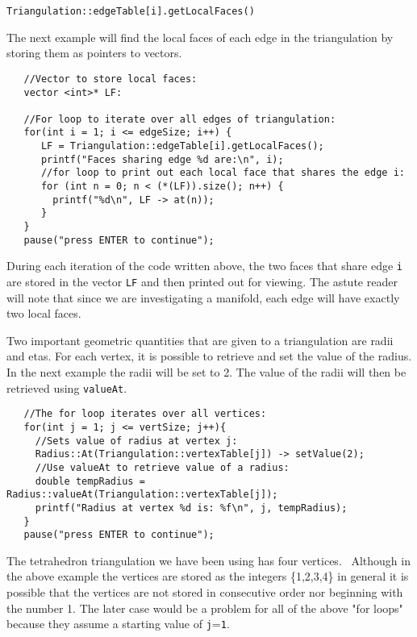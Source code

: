 \documentclass{amsart}
\theoremstyle{plain}
\numberwithin{equation}{section}
\begin{document}
\texttt{Triangulation::edgeTable[i].getLocalFaces()}

The next example will find the local faces of each edge in the triangulation
by storing them as pointers to vectors. \newline
\begin{verbatim}
   //Vector to store local faces:
   vector <int>* LF:
 
   //For loop to iterate over all edges of triangulation:
   for(int i = 1; i <= edgeSize; i++) {
      LF = Triangulation::edgeTable[i].getLocalFaces();
      printf("Faces sharing edge %d are:\n", i);
      //for loop to print out each local face that shares the edge i:
      for (int n = 0; n < (*(LF)).size(); n++) {
        printf("%d\n", LF -> at(n));
      }
   }
   pause("press ENTER to continue");
\end{verbatim}

\bigskip

During each iteration of the code written above, the two faces that share
edge \verb|i| are stored in the vector \verb|LF| and then printed out for
viewing. The astute reader will note that since we are investigating a
manifold, each edge will have exactly two local faces.

Two important geometric quantities that are given to a triangulation are
radii and etas. For each vertex, it is possible to retrieve and set the
value of the radius. In the next example the radii will be set to 2. The
value of the radii will then be retrieved using \verb|valueAt|. \newline
\begin{verbatim}
   //The for loop iterates over all vertices:
   for(int j = 1; j <= vertSize; j++){
     //Sets value of radius at vertex j:
     Radius::At(Triangulation::vertexTable[j]) -> setValue(2);
     //Use valueAt to retrieve value of a radius:
     double tempRadius = Radius::valueAt(Triangulation::vertexTable[j]);
     printf("Radius at vertex %d is: %f\n", j, tempRadius);
   }
   pause("press ENTER to continue");
\end{verbatim}

\bigskip

The tetrahedron triangulation we have been using has four vertices. \
Although in the above example the vertices are stored as the integers
\{1,2,3,4\} in general it is possible that the vertices are not stored in
consecutive order nor beginning with the number 1. The later case would be a
problem for all of the above "for loops" because they assume a starting
value of \verb|j|=\verb|1|.
\end{document}
